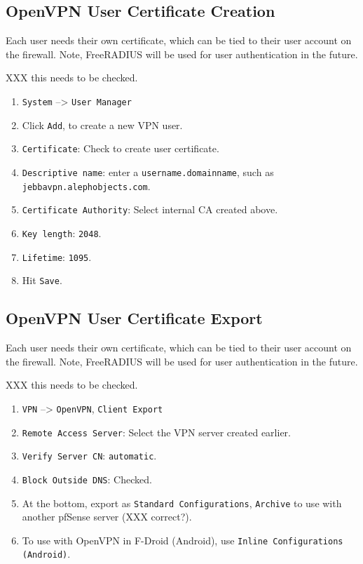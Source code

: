\subsection{OpenVPN User Certificate Creation}
Each user needs their own certificate, which can be tied to their user account on the firewall. Note, FreeRADIUS will be used for user authentication in the future.

XXX this needs to be checked.

\begin{enumerate}
 \item \texttt{System} --> \texttt{User Manager}
 \item Click \texttt{Add}, to create a new VPN user.
 \item \texttt{Certificate}: Check to create user certificate.
 \item \texttt{Descriptive name}: enter a \texttt{username.domainname}, such as \texttt{jebbavpn.alephobjects.com}.
 \item \texttt{Certificate Authority}: Select internal CA created above.
 \item \texttt{Key length}: \texttt{2048}.
 \item \texttt{Lifetime}: \texttt{1095}.
 \item Hit \texttt{Save}.
\end{enumerate}

\subsection{OpenVPN User Certificate Export}
Each user needs their own certificate, which can be tied to their user account on the firewall. Note, FreeRADIUS will be used for user authentication in the future.

XXX this needs to be checked.

\begin{enumerate}
 \item \texttt{VPN} --> \texttt{OpenVPN}, \texttt{Client Export}
 \item \texttt{Remote Access Server}: Select the VPN server created earlier.
 \item \texttt{Verify Server CN}: \texttt{automatic}.
 \item \texttt{Block Outside DNS}: Checked.
 \item At the bottom, export as \texttt{Standard Configurations}, \texttt{Archive} to use with another pfSense server (XXX correct?).
 \item To use with OpenVPN in F-Droid (Android), use \texttt{Inline Configurations (Android)}.
\end{enumerate}


